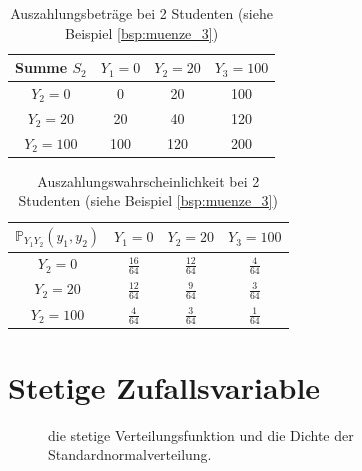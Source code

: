 {\begin{bsp}
    \end{bsp}

    \begin{table}
        \centering
        \begin{tabular}{c|ccc}
        \hline
        \textbf{Summe $S_2$} & $Y_1=0$ & $Y_2=20$ & $Y_3=100$\\
        \hline
         $Y_2=0$ & 0 & 20 & 100\\
         \hline
         $Y_2=20$ & 20 & 40 & 120\\
         \hline
         $Y_2=100$ & 100 & 120 & 200\\
         \hline
        \end{tabular}
        \caption{Auszahlungsbeträge bei 2 Studenten (siehe Beispiel \ref{bsp:muenze_3})}\label{tab:auszahlung_2_studenten}
    \end{table}

    \begin{table}
        \centering
        \begin{tabular}{c|ccc}
        \hline
        \textbf{$\mathbb P_{Y_1Y_2}(y_1,y_2)$} & $Y_1=0$ & $Y_2=20$ & $Y_3=100$\\
        \hline
         $Y_2=0$ & $\frac{16}{64}$ & $\frac{12}{64}$ & $\frac{4}{64}$\\
         \hline
         $Y_2=20$ & $\frac{12}{64}$ & $\frac{9}{64}$ & $\frac{3}{64}$\\
         \hline
         $Y_2=100$ & $\frac{4}{64}$ & $\frac{3}{64}$ & $\frac{1}{64}$\\
         \hline
        \end{tabular}
        \caption{Auszahlungswahrscheinlichkeit bei 2 Studenten (siehe Beispiel \ref{bsp:muenze_3})}\label{tab:auszahlungswahrscheinlichkeit_2_studenten}
    \end{table}

    \section{Stetige Zufallsvariable}

    \begin{figure}
    \centering
        \begin{tikzpicture}
            
        \end{tikzpicture}
        \caption{die stetige Verteilungsfunktion und die Dichte der Standardnormalverteilung.}
        \label{fig:stetige_verteilung_dichte}
    \end{figure}

}
